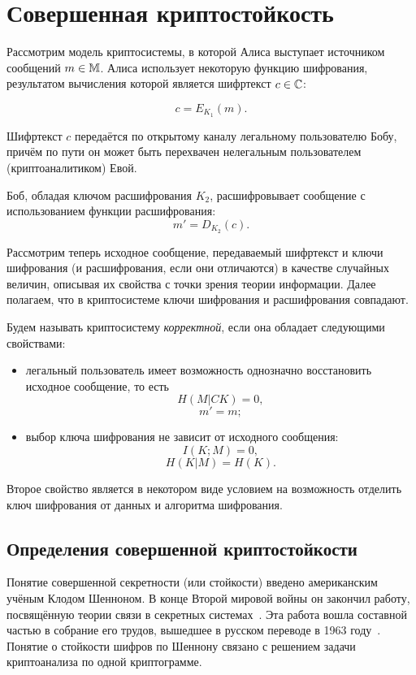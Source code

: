 \chapter{Совершенная криптостойкость}

Рассмотрим модель криптосистемы, в которой Алиса выступает источником сообщений $m \in \mathbb{M}$. Алиса использует некоторую функцию шифрования, результатом вычисления которой является шифртекст $c \in \mathbb{C}$:

	\[c = E_{K_1}\left(m\right).\]

Шифртекст $c$ передаётся по открытому каналу легальному пользователю Бобу, причём по пути он может быть перехвачен нелегальным пользователем (криптоаналитиком) Евой.

Боб, обладая ключом расшифрования $K_2$, расшифровывает сообщение с использованием функции расшифрования:
	\[m' = D_{K_2}\left(c \right).\]

Рассмотрим теперь исходное сообщение, передаваемый шифртекст и ключи шифрования (и расшифрования, если они отличаются) в качестве случайных величин, описывая их свойства с точки зрения теории информации. Далее полагаем, что в криптосистеме ключи шифрования и расшифрования совпадают.

Будем называть криптосистему \emph{корректной}, если она обладает следующими свойствами:
\begin{itemize}
	\item легальный пользователь имеет возможность однозначно восстановить исходное сообщение, то есть
					\[H \left( M | C K \right) = 0, \]
					\[m' = m;\]
	\item выбор ключа шифрования не зависит от исходного сообщения:
					\[ I \left( K ; M \right) = 0, \]
					\[ H \left( K | M \right) = H \left( K \right). \]
\end{itemize}

Второе свойство является в некотором виде условием на возможность отделить ключ шифрования от данных и алгоритма шифрования.

\section[Определения]{Определения совершенной криптостойкости}

Понятие совершенной секретности (или стойкости) введено американским учёным Клодом Шенноном. В конце Второй мировой войны он закончил работу, посвящённую теории связи в секретных системах~\cite{Shannon:1949:CTS}. Эта работа вошла составной частью в собрание его трудов, вышедшее в русском переводе в 1963 году~\cite{Shannon:1963}. Понятие о стойкости шифров по Шеннону связано с решением задачи криптоанализа по одной криптограмме.

